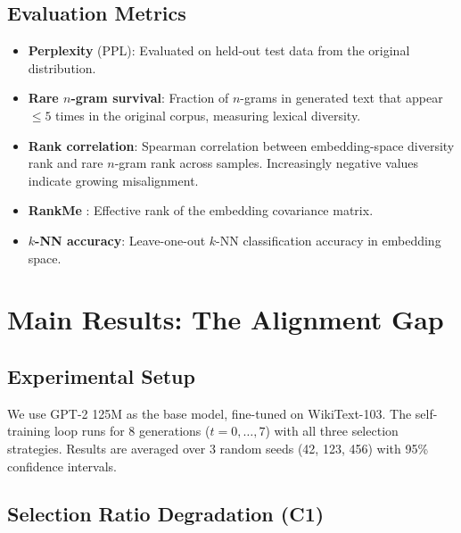 \documentclass[11pt,a4paper]{article}
\begin{document}
\subsection{Evaluation Metrics}

\begin{itemize}
\item \textbf{Perplexity} (PPL): Evaluated on held-out test data from the original distribution.
\item \textbf{Rare $n$-gram survival}: Fraction of $n$-grams in generated text that appear $\leq 5$ times in the original corpus, measuring lexical diversity.
\item \textbf{Rank correlation}: Spearman correlation between embedding-space diversity rank and rare $n$-gram rank across samples. Increasingly negative values indicate growing misalignment.
\item \textbf{RankMe} \cite{garrido2023rankme}: Effective rank of the embedding covariance matrix.
\item \textbf{$k$-NN accuracy}: Leave-one-out $k$-NN classification accuracy in embedding space.
\end{itemize}

\section{Main Results: The Alignment Gap}
\label{sec:main_results}

\subsection{Experimental Setup}

We use GPT-2 125M as the base model, fine-tuned on WikiText-103.
The self-training loop runs for 8 generations ($t = 0, \ldots, 7$) with all three selection strategies.
Results are averaged over 3 random seeds (42, 123, 456) with 95\% confidence intervals.

\subsection{Selection Ratio Degradation (C1)}
\end{document}
